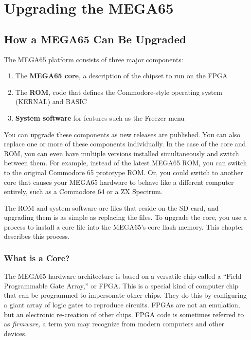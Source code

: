 \chapter{Upgrading the MEGA65}

\section{How a MEGA65 Can Be Upgraded}
\label{cha:cores}

The MEGA65 platform consists of three major components:

\begin{enumerate}
  \item The {\bf MEGA65 core}, a description of the chipset to run on the FPGA
  \item The {\bf ROM}, code that defines the Commodore-style operating system (KERNAL) and BASIC
  \item {\bf System software} for features such as the Freezer menu
\end{enumerate}

You can upgrade these components as new releases are published. You can also replace one or more of these components individually. In the case of the core and ROM, you can even have multiple versions installed simultaneously and switch between them. For example, instead of the latest MEGA65 ROM, you can switch to the original Commodore 65 prototype ROM. Or, you could switch to another core that causes your MEGA65 hardware to behave like a different computer entirely, such as a Commodore 64 or a ZX Spectrum.

The ROM and system software are files that reside on the SD card, and upgrading them is as simple as replacing the files. To upgrade the core, you use a process to install a core file into the MEGA65's core flash memory. This chapter describes this process.

\subsection{What is a Core?}

The MEGA65 hardware architecture is based on a versatile chip called a ``Field Programmable Gate Array,'' or FPGA. This is a special kind of computer chip that can be programmed to impersonate other chips. They do this by configuring a giant array of logic gates to reproduce circuits. FPGAs are not an emulation, but an electronic re-creation of other chips. FPGA code is sometimes referred to as {\em firmware,} a term you may recognize from modern computers and other devices.

